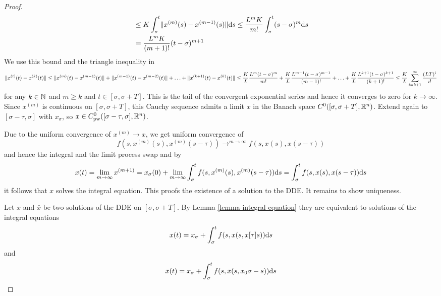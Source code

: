 \begin{proof}
\begin{align}
        & \leq K \int_\sigma^t \lVert x^{(m)}(s) - x^{(m-1)}(s)\rVert\text{d}s \leq \frac{L^m K}{m!} \int_\sigma^t (s-\sigma)^m\text{d}s\\
        & = \frac{L^m K}{(m+1)!}(t-\sigma)^{m+1}
    \end{align}
    We use this bound and the triangle inequality in
    \begin{equation}
        \lVert x^{(t)}(t)-x^{(k)}(t)\rVert\leq \lVert x^{(m)}(t)-x^{(m-1)}(t)\rVert + \lVert x^{(m-1)}(t)-x^{(m-2)}(t)\rVert +\ldots + \lVert x^{(k+1)}(t)-x^{(k)}(t)\rVert\\
        \leq \frac{K}{L}\frac{L^m (t-\sigma)^m}{m!} + \frac{K}{L}\frac{L^{m-1} (t-\sigma)^{m-1}}{(m-1)!} +\ldots +\frac{K}{L}\frac{L^{k+1} (t-\sigma)^{k+1}}{(k+1)!}\\
        \leq \frac{K}{L}\sum_{i=k+1}^\infty \frac{(LT)^i}{i!}
    \end{equation}
    for any $k\in\mathbb{N}$ and $m\geq k$ and $t\in [\sigma,\sigma+T]$.
    This is the tail of the convergent exponential series and hence it converges to zero for $k\rightarrow\infty$.
    Since $x^{(m)}$ is continuous on $[\sigma,\sigma+T]$, this Cauchy sequence admits a limit $x$ in the Banach space $C^0([\sigma,\sigma+T],\mathbb{R}^n)$. Extend again to $[\sigma-\tau,\sigma]$ with $x_\sigma$, so $x\in C^0_\text{pw}([\sigma-\tau,\sigma],\mathbb{R}^n)$.


    Due to the uniform convergence of $x^(m)\rightarrow x$, we get uniform convergence of
    \begin{equation}
        f(s,x^{(m)}(s),x^{(m)}(s-\tau)) \rightarrow^{m\rightarrow\infty} f(s,x(s),x(s-\tau))
    \end{equation}
    and hence the integral and the limit process swap and by
    \begin{equation}
        x(t) = \lim_{m\rightarrow\infty} x^{(m+1)} = x_\sigma(0) + \lim_{m\rightarrow\infty}\int_\sigma^t f(s,x^{(m)}(s),x^{(m)}(s-\tau))\text{d}s = \int_\sigma^t f(s,x(s),x(s-\tau))\text{d}s
    \end{equation}
    it follows that $x$ solves the integral equation.
    This proofs the existence of a solution to the DDE. It remains to show uniqueness.

    Let $x$ and $\bar{x}$ be two solutions of the DDE on $[\sigma,\sigma+T]$.
    By Lemma \ref{lemma-integral-equation} they are equivalent to solutions of the integral equations
    \begin{equation}
        x(t) = x_\sigma + \int_\sigma^t f(s,x(s,x[\tau]{s}))\text{d}s
    \end{equation}
    and
    \begin{equation}
        \bar{x}(t) = x_\sigma + \int_\sigma^t f(s,\bar{x}(s,x_0{\sigma-s}))\text{d}s
    \end{equation}


\end{proof}
